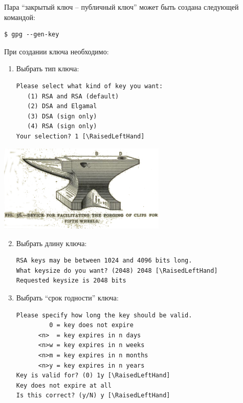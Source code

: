 \documentclass[presentation]{beamer}
\newcommand{\RaisedLeftHand}{%
  \raisebox{-.50em}{\Large\HandLeft}
}
\begin{document}
\begin{frame}[fragile]{}
  Пара ``закрытый ключ -- публичный ключ'' может быть создана
  следующей командой:
\begin{verbatim}
$ gpg --gen-key
\end{verbatim}
  При создании ключа необходимо:
  \begin{enumerate}
  \item Выбрать тип ключа:
    \small
\begin{Verbatim}[commandchars=\\\[\]]
Please select what kind of key you want:
   (1) RSA and RSA (default)
   (2) DSA and Elgamal
   (3) DSA (sign only)
   (4) RSA (sign only)
Your selection? 1 [\RaisedLeftHand]
\end{Verbatim}
\normalsize
  \end{enumerate}
  \vspace*{-3\baselineskip}
  \hspace*{14\baselineskip}
  \includegraphics[width=0.6\textwidth]{anvil-00}
\end{frame}

\begin{frame}[fragile]{}
  \begin{enumerate}
    \setcounter{enumi}{1}
  \item Выбрать длину ключа:
    \small
\begin{Verbatim}[commandchars=\\\[\]]
RSA keys may be between 1024 and 4096 bits long.
What keysize do you want? (2048) 2048 [\RaisedLeftHand]
Requested keysize is 2048 bits
\end{Verbatim}
\normalsize
\item Выбрать ``срок годности'' ключа:
  \small
\begin{Verbatim}[commandchars=\\\[\]]
Please specify how long the key should be valid.
         0 = key does not expire
      <n>  = key expires in n days
      <n>w = key expires in n weeks
      <n>m = key expires in n months
      <n>y = key expires in n years
Key is valid for? (0) 1y [\RaisedLeftHand]
Key does not expire at all
Is this correct? (y/N) y [\RaisedLeftHand]
\end{Verbatim}
\normalsize
    \end{enumerate}
\end{frame}
\end{document}
